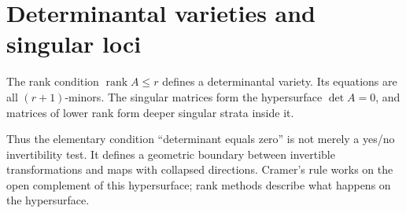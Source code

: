 \section{Determinantal varieties and singular loci}

The rank condition $\operatorname{rank}A\le r$ defines a determinantal variety.  Its equations are all $(r+1)$-minors.  The singular matrices form the hypersurface $\det A=0$, and matrices of lower rank form deeper singular strata inside it.

Thus the elementary condition ``determinant equals zero'' is not merely a yes/no invertibility test.  It defines a geometric boundary between invertible transformations and maps with collapsed directions.  Cramer's rule works on the open complement of this hypersurface; rank methods describe what happens on the hypersurface.
